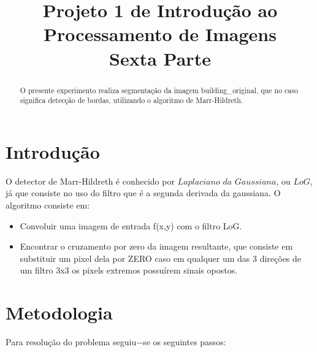 \documentclass[conference]{IEEEtran}
\begin{document}
\title{Projeto 1 de Introdu\c{c}\~ao ao Processamento de Imagens \\ Sexta Parte}
\author{
}
\maketitle
\begin{abstract}
O presente experimento realiza segmenta\c{c}\~ao da imagem building\_original, que no caso significa detec\c{c}\~ao de bordas, utilizando o algoritmo de Marr-Hildreth.
\end{abstract}

\section{ Introdu\c{c}\~ao} 
\label{sec:meth} 
	O detector de  Marr-Hildreth \'e conhecido por $Laplaciano $ $da $ $Gaussiana $, ou $LoG$, j\'a que consiste no uso do filtro que \'e a segunda derivada da gaussiana. O algoritmo consiste em:
\begin{itemize}
	\item Convoluir uma imagem de entrada f(x,y) com o filtro LoG.
	\item Encontrar o cruzamento por zero da imagem resultante, que consiste em substituir um pixel dela por ZERO caso em qualquer um das 3 dire\c{c}\~oes de um filtro 3x3 os pixels extremos possu\'irem sinais opostos.  
\end{itemize}
 
\section{Metodologia} 
\label{sec:meth} 
Para resolu\c{c}\~ao do problema seguiu$-$se os seguintes passos:
\end{document}
